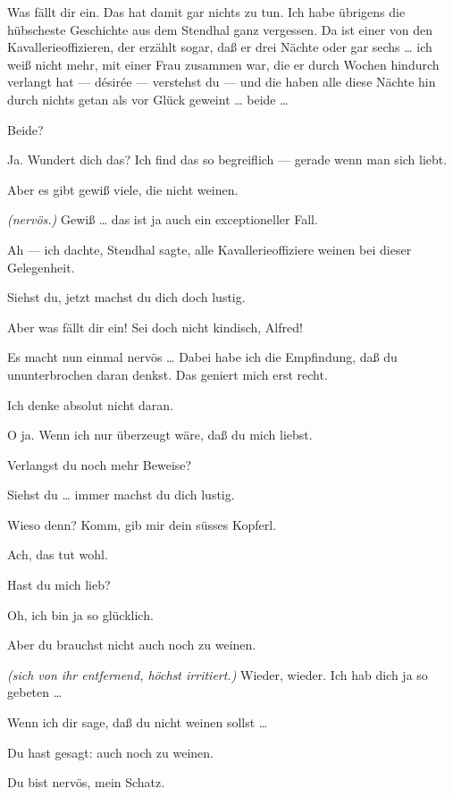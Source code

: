 \documentclass[
	final,
	a4paper,
	ngerman,
	mpinclude = true, %
	twoside = true,
	open = right,
	cleardoublepage = plain,
	DIV = 13,
	BCOR = 1cm,
	titlepage = firstiscover,
	]{scrbook}
\newcommand{\direction}[1]{\textit{(#1)}}
\newcommand{\thecharacter}[1]{\textup{\textsc{#1}}\xspace}
\newcommand{\theherr}{\thecharacter{Junger Herr}}
\newcommand{\thefrau}{\thecharacter{Junge Frau}}
\newcommand{\character}[1]{\item[#1:]}
\newcommand{\herr}{\character{\theherr}}
\newcommand{\frau}{\character{\thefrau}}
\begin{document}
\begin{play}
	\herr
	Was fällt dir ein. Das hat damit gar nichts zu tun. Ich habe übrigens die hübscheste Geschichte aus dem Stendhal ganz vergessen. Da ist einer von den Kavallerieoffizieren, der erzählt sogar, daß er drei Nächte oder gar sechs \ldots{} ich weiß nicht mehr, mit einer Frau zusammen war, die er durch Wochen hindurch verlangt hat --- désirée --- verstehst du --- und die haben alle diese Nächte hin durch nichts getan als vor Glück geweint \ldots{} beide \ldots{}

	\frau
	Beide?

	\herr
	Ja. Wundert dich das? Ich find das so begreiflich --- gerade wenn man sich liebt.

	\frau
	Aber es gibt gewiß viele, die nicht weinen.

	\herr
	\direction{nervös.} Gewiß \ldots{} das ist ja auch ein exceptioneller Fall.

	\frau
	Ah --- ich dachte, Stendhal sagte, alle Kavallerieoffiziere weinen bei dieser Gelegenheit.

	\herr
	Siehst du, jetzt machst du dich doch lustig.

	\frau
	Aber was fällt dir ein! Sei doch nicht kindisch, Alfred!

	\herr
	Es macht nun einmal nervös \ldots{} Dabei habe ich die Empfindung, daß du ununterbrochen daran denkst. Das geniert mich erst recht.

	\frau
	Ich denke absolut nicht daran.

	\herr
	O ja. Wenn ich nur überzeugt wäre, daß du mich liebst.

	\frau
	Verlangst du noch mehr Beweise?

	\herr
	Siehst du \ldots{} immer machst du dich lustig.

	\frau
	Wieso denn? Komm, gib mir dein süsses Kopferl.

	\herr
	Ach, das tut wohl.

	\frau
	Hast du mich lieb?

	\herr
	Oh, ich bin ja so glücklich.

	\frau
	Aber du brauchst nicht auch noch zu weinen.

	\herr
	\direction{sich von ihr entfernend, höchst irritiert.} Wieder, wieder. Ich hab dich ja so gebeten \ldots{}

	\frau
	Wenn ich dir sage, daß du nicht weinen sollst \ldots{}

	\herr
	Du hast gesagt: auch noch zu weinen.

	\frau
	Du bist nervös, mein Schatz.


\end{play}
\end{document}
